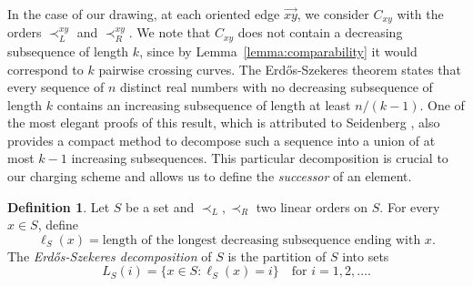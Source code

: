 \documentclass[11pt]{amsart}
\theoremstyle{definition}
\newtheorem{definition}[theorem]{Definition}
\begin{document}
In the case of our drawing, at each oriented edge $\vec{xy}$, we consider $C_{xy}$ with the orders $\prec_L^{xy}$ and $\prec_R^{xy}$. We note that $C_{xy}$ does not contain a decreasing subsequence of length $k$, since by Lemma~\ref{lemma:comparability} it would correspond to $k$ pairwise crossing curves. The Erd\H{o}s-Szekeres theorem \cite{ESz} states that every sequence of $n$ distinct real numbers with no decreasing subsequence of length $k$ contains an increasing subsequence of length at least $n/(k-1)$. 
One of the most elegant proofs of this result, which is attributed to Seidenberg \cite{Seidenberg}, also provides a compact method to decompose such a sequence into a union of at most $k-1$ increasing subsequences.
This particular decomposition is crucial to our charging scheme and allows us to define the \emph{successor} of an element.

\begin{definition}
    Let $S$ be a set and $\prec_L,\prec_R$ two linear orders on $S$. For every $x\in S$, define 
    $$\ell_S(x)=\text{length of the longest decreasing subsequence ending with }x.$$
    The \emph{Erd\H{o}s-Szekeres decomposition} of $S$ is the partition of $S$ into sets
    $$L_S(i)=\{x\in S: \ell_S(x)=i\}\quad\text{for }i=1,2,\dots.$$
\end{definition}
\end{document}
